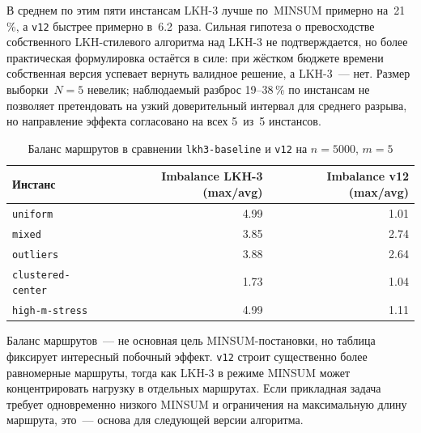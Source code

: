 \documentclass[14pt,a4paper]{extarticle}
\begin{document}
В среднем по этим пяти инстансам LKH-3 лучше по~MINSUM примерно на~21\,\%, а \texttt{v12} быстрее примерно в~6.2~раза. Сильная гипотеза о превосходстве собственного LKH-стилевого алгоритма над LKH-3 не подтверждается, но более практическая формулировка остаётся в силе: при жёстком бюджете времени собственная версия успевает вернуть валидное решение, а LKH-3~--- нет. Размер выборки~$N=5$ невелик; наблюдаемый разброс 19--38\,\% по инстансам не позволяет претендовать на узкий доверительный интервал для среднего разрыва, но направление эффекта согласовано на всех 5~из~5 инстансов.

\begin{table}[H]
\centering
\caption{Баланс маршрутов в сравнении \texttt{lkh3-baseline} и \texttt{v12} на $n=5000$, $m=5$}
\small
\begin{tabular}{lrr}
\toprule
Инстанс & Imbalance LKH-3 (max/avg) & Imbalance v12 (max/avg)\\
\midrule
\texttt{uniform}          & 4.99 & 1.01\\
\texttt{mixed}            & 3.85 & 2.74\\
\texttt{outliers}         & 3.88 & 2.64\\
\texttt{clustered-center} & 1.73 & 1.04\\
\texttt{high-m-stress}    & 4.99 & 1.11\\
\bottomrule
\end{tabular}
\normalsize
\end{table}

Баланс маршрутов~--- не основная цель MINSUM-постановки, но таблица фиксирует интересный побочный эффект. \texttt{v12} строит существенно более равномерные маршруты, тогда как LKH-3 в режиме MINSUM может концентрировать нагрузку в отдельных маршрутах. Если прикладная задача требует одновременно низкого MINSUM и ограничения на максимальную длину маршрута, это~--- основа для следующей версии алгоритма.
\end{document}
